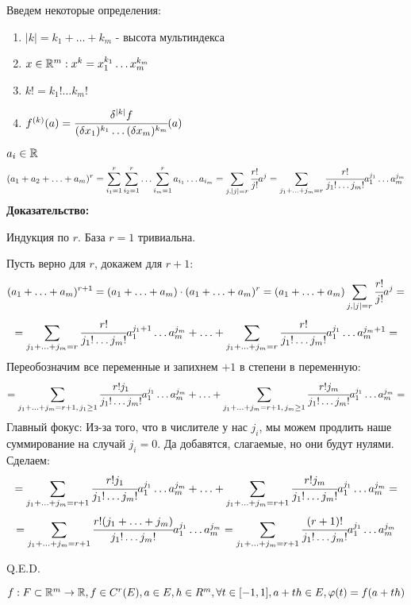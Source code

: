 Введем некоторые определения:
\begin{enumerate}
    \item $|k| = k_1 + \ldots + k_m$ - высота мультиндекса
    \item $x\in \mathbb{R}^m : x^k= x_1^{k_1}\ldots x_m^{k_m}$
    \item $k! = k_1!\ldots k_m!$
    \item $f^{(k)}(a) = \cfrac{\delta^{|k|}f}{(\delta x_1)^{k_1}\ldots (\delta x_m)^{k_m}}(a)$
\end{enumerate}


$a_i \in \mathbb{R}$
$$(a_1 + a_2 + \ldots + a_m)^r = \sum\limits_{i_1=1}^r\sum\limits_{i_2=1}^r\ldots\sum\limits_{i_m=1}^ra_{i_1}\ldots a_{i_m} = \sum\limits_{j, |j| = r}\cfrac{r!}{j!}a^j = \sum\limits_{j_1 + \ldots +j_m = r} \cfrac{r!}{j_1!\ldots j_m!}a_1^{j_1}\ldots a_m^{j_m}$$
\textbf{Доказательство:}

Индукция по $r$. База $r = 1$ тривиальна.

Пусть верно для $r$, докажем для $r+1$:
$$(a_1 + \ldots + a_m)^{r+1} = (a_1 + \ldots + a_m)\cdot (a_1 + \ldots + a_m)^r = (a_1 + \ldots + a_m) \sum\limits_{j, |j| = r}\cfrac{r!}{j!}a^j = $$
$$=\sum\limits_{j_1 + \ldots +j_m = r} \cfrac{r!}{j_1!\ldots j_m!}a_1^{j_1+1}\ldots a_m^{j_m} + \ldots + \sum\limits_{j_1 + \ldots +j_m = r} \cfrac{r!}{j_1!\ldots j_m!}a_1^{j_1}\ldots a_m^{j_m+1}=$$
Переобозначим все переменные и запихнем $+1$ в степени в переменную:
$$=\sum\limits_{j_1 + \ldots +j_m = r+1, \, j_1 \geq 1} \cfrac{r!j_1}{j_1!\ldots j_m!}a_1^{j_1}\ldots a_m^{j_m} + 
\ldots + \sum\limits_{j_1 + \ldots +j_m = r+1, \, j_m \geq 1} \cfrac{r!j_m}{j_1!\ldots j_m!}a_1^{j_1}\ldots a_m^{j_m} = $$
Главный фокус: Из-за того, что в числителе у нас $j_i$, мы можем продлить наше суммирование на случай $j_i =0$. Да добавятся, слагаемые, но они будут нулями. Сделаем:
$$=\sum\limits_{j_1 + \ldots +j_m = r+1} \cfrac{r!j_1}{j_1!\ldots j_m!}a_1^{j_1}\ldots a_m^{j_m} + 
\ldots + \sum\limits_{j_1 + \ldots +j_m = r+1} \cfrac{r!j_m}{j_1!\ldots j_m!}a_1^{j_1}\ldots a_m^{j_m} = $$
$$=\sum\limits_{j_1 + \ldots +j_m = r+1}\cfrac{r!(j_1 + \ldots + j_m)}{j_1!\ldots j_m!}a_1^{j_1}\ldots a_m^{j_m}  =\sum\limits_{j_1 + \ldots +j_m = r+1}\cfrac{(r+1)!}{j_1!\ldots j_m!}a_1^{j_1}\ldots a_m^{j_m} $$

\hfill Q.E.D.


$f: F \subset \mathbb{R}^m \rightarrow \mathbb{R}, f \in C^r(E), a\in E, h \in R^m, \forall t \in [-1,1], a+th \in E, \varphi(t) = f(a+th)$

